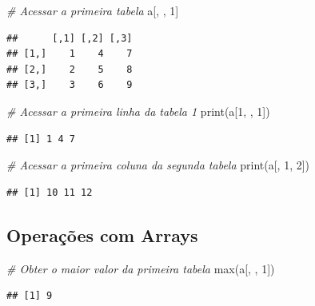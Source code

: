 \documentclass[
]{article}
\newenvironment{Shaded}{\begin{snugshade}}{\end{snugshade}}
\newcommand{\CommentTok}[1]{\textcolor[rgb]{0.56,0.35,0.01}{\textit{#1}}}
\newcommand{\DecValTok}[1]{\textcolor[rgb]{0.00,0.00,0.81}{#1}}
\newcommand{\FunctionTok}[1]{\textcolor[rgb]{0.00,0.00,0.00}{#1}}
\newcommand{\NormalTok}[1]{#1}
\begin{document}
\begin{Shaded}
\begin{Highlighting}[]
\CommentTok{\# Acessar a primeira tabela}
\NormalTok{a[, , }\DecValTok{1}\NormalTok{]}
\end{Highlighting}
\end{Shaded}

\begin{verbatim}
##      [,1] [,2] [,3]
## [1,]    1    4    7
## [2,]    2    5    8
## [3,]    3    6    9
\end{verbatim}

\begin{Shaded}
\begin{Highlighting}[]
\CommentTok{\# Acessar a primeira linha da tabela 1}
\FunctionTok{print}\NormalTok{(a[}\DecValTok{1}\NormalTok{, , }\DecValTok{1}\NormalTok{])}
\end{Highlighting}
\end{Shaded}

\begin{verbatim}
## [1] 1 4 7
\end{verbatim}

\begin{Shaded}
\begin{Highlighting}[]
\CommentTok{\# Acessar a primeira coluna da segunda tabela}
\FunctionTok{print}\NormalTok{(a[, }\DecValTok{1}\NormalTok{, }\DecValTok{2}\NormalTok{])}
\end{Highlighting}
\end{Shaded}

\begin{verbatim}
## [1] 10 11 12
\end{verbatim}

\hypertarget{operauxe7uxf5es-com-arrays}{%
\subsection{Operações com Arrays}\label{operauxe7uxf5es-com-arrays}}

\begin{Shaded}
\begin{Highlighting}[]
\CommentTok{\# Obter o maior valor da primeira tabela}
\FunctionTok{max}\NormalTok{(a[, , }\DecValTok{1}\NormalTok{])}
\end{Highlighting}
\end{Shaded}

\begin{verbatim}
## [1] 9
\end{verbatim}
\end{document}
